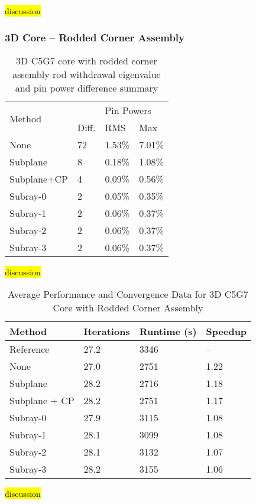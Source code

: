 \hl{discussion}

\subsubsection{3D Core -- Rodded Corner Assembly}

\begin{table}
\centering
\caption[3D C5G7 Core with Rodded Corner Assembly]{3D C5G7 core with rodded corner assembly rod withdrawal eigenvalue and pin power difference summary}\label{t:c5g7-3d-core-corner}
\begin{tabular}{l l l l}\toprule
    \multirow{2}{*}{Method} & \keff{} & \multicolumn{2}{l}{Pin Powers} \\
    & Diff. & RMS & Max \\\midrule
None        & 72 & 1.53\% & 7.01\% \\
Subplane    & 8  & 0.18\% & 1.08\% \\
Subplane+CP & 4  & 0.09\% & 0.56\% \\
Subray-0    & 2  & 0.05\% & 0.35\% \\
Subray-1    & 2  & 0.06\% & 0.37\% \\
Subray-2    & 2  & 0.06\% & 0.37\% \\
Subray-3    & 2  & 0.06\% & 0.37\% \\
    \bottomrule
\end{tabular}
\end{table}

\hl{discussion}

\begin{table}[h]
    \centering
    \caption[3D C5G7 Core with Rodded Corner Assembly Performance]{Average Performance and Convergence Data for 3D C5G7 Core with Rodded Corner  Assembly}\label{t:subray-performance-3Dcore-corner}
    \begin{tabular}{l l l l}\toprule
        Method & Iterations & Runtime (s) & Speedup \\\midrule
        Reference     & 27.2 & 3346 & --   \\
        None          & 27.0 & 2751 & 1.22 \\
        Subplane      & 28.2 & 2716 & 1.18 \\
        Subplane + CP & 28.2 & 2751 & 1.17 \\
        Subray-0      & 27.9 & 3115 & 1.08 \\
        Subray-1      & 28.1 & 3099 & 1.08 \\
        Subray-2      & 28.1 & 3132 & 1.07 \\
        Subray-3      & 28.2 & 3155 & 1.06 \\
        \bottomrule
    \end{tabular}
\end{table}

\hl{discussion}